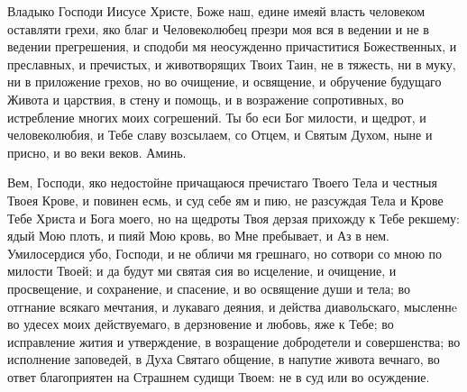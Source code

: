 

Владыко Господи Иисусе Христе, Боже наш, едине имеяй власть человеком оставляти грехи, яко благ и Человеколюбец презри моя вся в ведении и не в ведении прегрешения, и сподоби мя неосужденно причаститися Божественных, и преславных, и пречистых, и животворящих Твоих Таин, не в тяжесть, ни в муку, ни в приложение грехов, но во очищение, и освящение, и обручение будущаго Живота и царствия, в стену и помощь, и в возражение сопротивных, во истребление многих моих согрешений. Ты бо еси Бог милости, и щедрот, и человеколюбия, и Тебе славу возсылаем, со Отцем, и Святым Духом, ныне и присно, и во веки веков. Аминь.




Вем, Господи, яко недостойне причащаюся пречистаго Твоего Тела и честныя Твоея Крове, и повинен есмь, и суд себе ям и пию, не разсуждая Тела и Крове Тебе Христа и Бога моего, но на щедроты Твоя дерзая прихожду к Тебе рекшему: ядый Мою плоть, и пияй Мою кровь, во Мне пребывает, и Аз в нем. Умилосердися убо, Господи, и не обличи мя грешнаго, но сотвори со мною по милости Твоей; и да будут ми святая сия во исцеление, и очищение, и просвещение, и сохранение, и спасение, и во освящение души и тела; во отгнание всякаго мечтания, и лукаваго деяния, и действа диавольскаго, мысленнe во удесех моих действуемаго, в дерзновение и любовь, яже к Тебе; во исправление жития и утверждение, в возращение добродетели и совершенства; во исполнение заповедей, в Духа Святаго общение, в напутие живота вечнаго, во ответ благоприятен на Страшнем судищи Твоем: не в суд или во осуждение.




